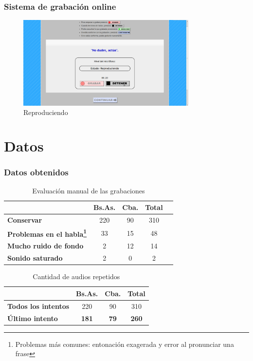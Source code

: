 \documentclass[mathserif]{beamer}%
\begin{document}
\begin{frame}
	\frametitle{Sistema de grabación online}
	
	\begin{figure}[h!]
		\centerline{\includegraphics[width=0.8\textwidth]{pag-play1} }
		\caption{Reproduciendo}
		\label{figEncuesta}
	\end{figure}
\end{frame}

\section{Datos}

\begin{frame}
	\frametitle{Datos obtenidos}
	
	\begin{table}[h]
		\centering
		\begin{tabular}{|l|c|c|c|c|}
			\hline
			\textbf{}  & \textbf{Bs.As. } & \textbf{Cba.} & \textbf{Total} \\ \hline
			\textbf{Conservar}  & 220 & 90 & 310 \\ \hline
			\textbf{Problemas en el habla\footnote{Problemas más comunes: entonación exagerada y error al pronunciar una frase}}  & 33 & 15 & 48 \\ \hline
			\textbf{Mucho ruido de fondo}  & 2 & 12 & 14 \\ \hline
			\textbf{Sonido saturado}  & 2 & 0 & 2 \\ \hline
		\end{tabular}
		\caption{Evaluación manual de las grabaciones}
		\label{eva_table}
	\end{table}
	
	\begin{table}[H]
		\centering
		\begin{tabular}{|l|c|c|c|}
			\hline
			\textbf{}  & \textbf{Bs.As. } & \textbf{Cba.} & \textbf{Total} \\ \hline
			\textbf{Todos los intentos}  & 220 & 90 & 310 \\ \hline
			\cellcolor{blue!25}\textbf{Último intento}  & \cellcolor{blue!25}\textbf{181} & \cellcolor{blue!25}\textbf{79} & \cellcolor{blue!25}\textbf{260} \\ \hline
		\end{tabular}
		\caption{Cantidad de audios repetidos}
		\label{eva_table_rep}
	\end{table}
\end{frame}
\end{document}
